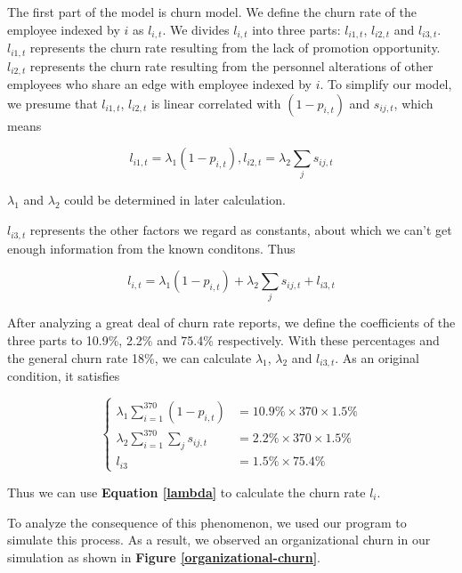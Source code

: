 \documentclass[12pt,a4paper,titlepage]{article}
\begin{document}
The first part of the model is churn model. We define the churn rate of
the employee indexed by $i$ as $l_{i,t}$. We divides $l_{i,t}$ into three
parts: $l_{i1,t}$, $l_{i2,t}$ and $l_{i3,t}$.  $l_{i1,t}$
represents the churn rate resulting from the lack of promotion
opportunity. $l_{i2,t}$ represents the churn rate resulting from the personnel alterations of other employees who share an edge with employee indexed by $i$. To simplify our model, we
presume that $l_{i1,t}$, $l_{i2,t}$ is linear correlated with $(1-p_{i,t})$ and
$s_{ij,t}$, which means

\begin{equation}
  l_{i1,t}=\lambda_1(1-p_{i,t}),l_{i2,t}=\lambda_2\sum_{j}s_{ij,t}
\end{equation}

$\lambda_1$ and $\lambda_2$ could be determined in later calculation.

$l_{i3,t}$ represents the other factors we regard as constants, about which we can't get enough information from the known conditons.  Thus

\begin{equation}
l_{i,t}=\lambda_1(1-p_{i,t}) + \lambda_2 \sum_{j} s_{ij,t} + l_{i3,t}
\end{equation}

After analyzing a great deal of churn rate reports, we define the
coefficients of the three parts to 10.9\%, 2.2\% and 75.4\%
respectively\cite{1}\cite{2}. With these percentages and the general
churn rate 18\%, we can calculate $\lambda_1$, $\lambda_2$ and
$l_{i3,t}$. As an original condition, it satisfies

\begin{equation}
\label{lambda}
\begin{cases}
  \lambda_1 \sum_{i=1}^{370}(1-p_{i,t}) & =10.9\% \times 370 \times 1.5\% \\
  \lambda_2 \sum_{i=1}^{370}\sum_{j}s_{ij,t} & =2.2\% \times 370 \times 1.5\% \\
  l_{i3} & =1.5 \% \times 75.4 \%
\end{cases}
\end{equation}

Thus we can use \textbf{Equation \ref{lambda}} to calculate the churn rate $l_i$.

To analyze the consequence of this phenomenon, we used our program to
simulate this process. As a result, we observed an organizational churn in
our simulation as shown in \textbf{Figure \ref{organizational-churn}}.
\end{document}
